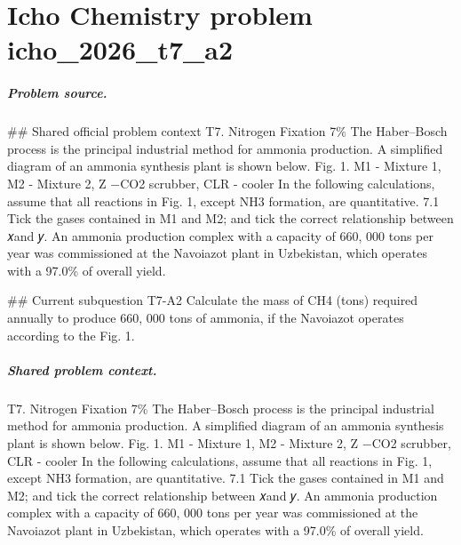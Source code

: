 
\chapter{Icho Chemistry problem icho\_2026\_t7\_a2}
\label{ch:IChO2026Problems_problem_icho_2026_t7_a2}

\paragraph{Problem source.}
\#\# Shared official problem context
T7. Nitrogen Fixation 7\% The Haber–Bosch process is the principal industrial method for ammonia production. A simplified diagram of an ammonia synthesis plant is shown below. Fig. 1. M1 - Mixture 1, M2 - Mixture 2, Z −CO2 scrubber, CLR - cooler In the following calculations, assume that all reactions in Fig. 1, except NH3 formation, are quantitative. 7.1 Tick the gases contained in M1 and M2; and tick the correct relationship between 𝑥and 𝑦. An ammonia production complex with a capacity of 660, 000 tons per year was commissioned at the Navoiazot plant in Uzbekistan, which operates with a 97.0\% of overall yield.

\#\# Current subquestion T7-A2
Calculate the mass of CH4 (tons) required annually to produce 660, 000 tons of ammonia, if the Navoiazot operates according to the Fig. 1.

\paragraph{Shared problem context.}
T7. Nitrogen Fixation 7\% The Haber–Bosch process is the principal industrial method for ammonia production. A simplified diagram of an ammonia synthesis plant is shown below. Fig. 1. M1 - Mixture 1, M2 - Mixture 2, Z −CO2 scrubber, CLR - cooler In the following calculations, assume that all reactions in Fig. 1, except NH3 formation, are quantitative. 7.1 Tick the gases contained in M1 and M2; and tick the correct relationship between 𝑥and 𝑦. An ammonia production complex with a capacity of 660, 000 tons per year was commissioned at the Navoiazot plant in Uzbekistan, which operates with a 97.0\% of overall yield.

